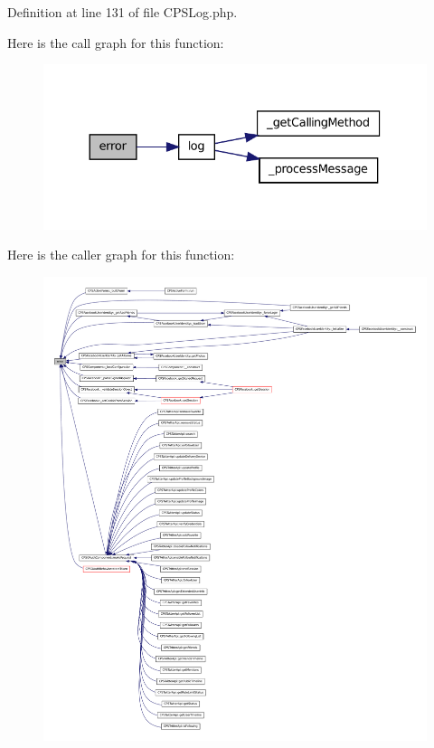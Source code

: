 Definition at line 131 of file CPSLog.php.








Here is the call graph for this function:\nopagebreak
\begin{figure}[H]
\begin{center}
\leavevmode
\includegraphics[width=330pt]{classCPSLog_a99034739d5e469b037364bf2f5694e11_cgraph}
\end{center}
\end{figure}




Here is the caller graph for this function:\nopagebreak
\begin{figure}[H]
\begin{center}
\leavevmode
\includegraphics[width=400pt]{classCPSLog_a99034739d5e469b037364bf2f5694e11_icgraph}
\end{center}
\end{figure}


